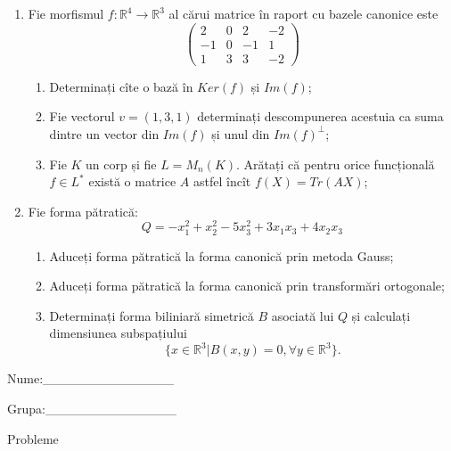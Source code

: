 \documentclass{article}
\begin{document}
\begin{enumerate}
 \item Fie morfismul $f:\mathbb{R}^4 \to \mathbb{R}^3$ al cărui matrice în raport cu bazele canonice este
$$\begin{pmatrix}
2&0&2&-2\\
-1&0&-1&1\\
1&3&3&-2
\end{pmatrix}$$

\begin{enumerate}
\item Determinați cîte o bază în $Ker(f)$ și $Im(f)$;
\item Fie vectorul $v=(1,3,1)$ determinați descompunerea acestuia ca suma dintre un vector din $Im(f)$ și unul din $Im(f)^\perp$;
\item Fie $K$ un corp și fie $L=M_n(K)$. Arătați că pentru orice funcțională $f \in L^*$ există o matrice $A$ astfel încît $f(X)=Tr(AX)$;
\end{enumerate}
\item Fie forma pătratică:
$$Q= -x_1^2+x_2^2-5x_3^2+3x_1x_3+4x_2x_3$$

\begin{enumerate}
\item Aduceți forma pătratică la forma canonică prin metoda Gauss;
\item Aduceți forma pătratică la forma canonică prin transformări ortogonale;
\item Determinați forma biliniară simetrică $B$ asociată lui $Q$ și calculați dimensiunea subspațiului
$$\{x \in \mathbb{R}^3 | B(x,y)=0,\forall y \in \mathbb{R}^3\}.$$

\end{enumerate}
\end{enumerate}
\newpage
\begin{flushright}
Nume:\_\_\_\_\_\_\_\_\_\_\_\_\_\_
 
 
Grupa:\_\_\_\_\_\_\_\_\_\_\_\_\_\_
\end{flushright}
\begin{center}
\vspace{2cm}
{\Large Probleme}
\vspace{2cm}
\end{center}
\end{document}
